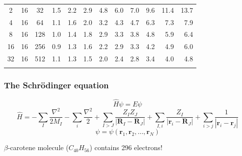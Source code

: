\documentclass[mathserif]{beamer}
\begin{document}
\begin{frame}
\begin{table}
\begin{tabular}{cccrrrrrrrrr}
	  2& 16& 32	&  1.5 	&  2.2 	&  2.9 	&  4.8  &  6.0  &  7.0  &  9.6  & 11.4  & 13.7  \\
	  4& 16& 64	&  1.1 	&  1.6 	&  2.0 	&  3.2  &  4.3  &  4.7  &  6.3  &  7.3  &  7.9  \\
	  8& 16&128	&  1.0 	&  1.4 	&  1.8 	&  2.9  &  3.3  &  3.8  &  4.8  &  5.9  &  6.4  \\
	 16& 16&256	&  0.9 	&  1.3 	&  1.6 	&  2.2  &  2.9  &  3.3  &  4.2  &  4.9  &  6.0  \\
	 32& 16&512	&  1.1 	&  1.3 	&  1.5 	&  2.0  &  2.4  &  2.8  &  3.4  &  4.0  &  4.8  \\
	   &   &   	&      	&      	&      	&    	&    	&	&	&	&	\\
	\hline                                                                           
	\hline
    \end{tabular}
    \end{table}
\end{frame}

\begin{frame}
    \frametitle{The Schr\"{o}dinger equation}
    \begin{equation}
	\hat{H}\psi = E\psi
    \end{equation}
    \begin{equation}
	\hat{H} =   -\sum_I \frac{\nabla^2}{2M_I} - \sum_i \frac{\nabla^2}{2}
		    +\sum_{I>J} \frac{Z_IZ_J}{|\boldsymbol{R}_I-\boldsymbol{R}_J|} 
		    +\sum_{I,i} \frac{Z_I}{|\boldsymbol{r}_i-\boldsymbol{R}_J|} 
		    +\sum_{i>j} \frac{1}{|\boldsymbol{r}_i-\boldsymbol{r}_j|} 
    \end{equation}
    \begin{equation}
	\psi = \psi(\boldsymbol{r}_1,\boldsymbol{r}_2,\dots,\boldsymbol{r}_N)
    \end{equation}

    $\beta$-carotene molecule ($C_{40}H_{56}$) contains 296 electrons!
\end{frame}
\end{document}
